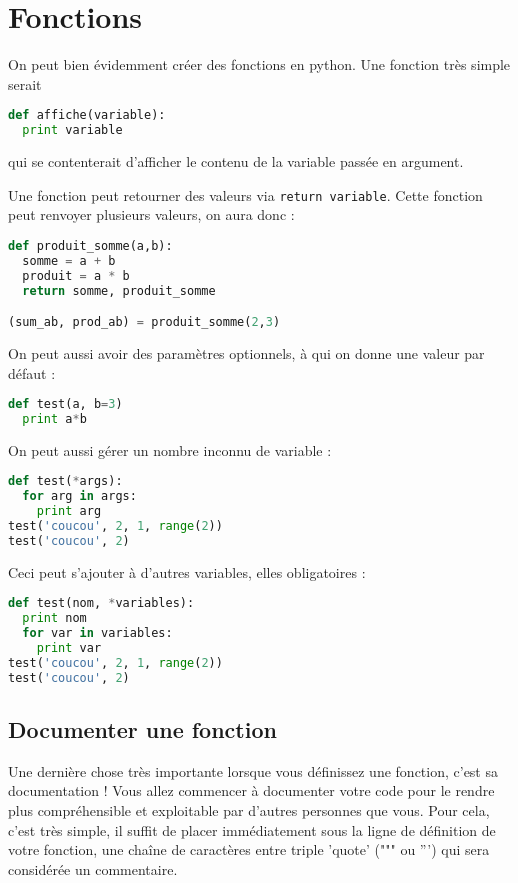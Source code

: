 \documentclass[a4paper,twoside]{article}
\begin{document}
\section{Fonctions}
On peut bien évidemment créer des fonctions en python. Une fonction très simple serait
\begin{lstlisting}[language=python]
def affiche(variable):
  print variable
\end{lstlisting}
qui se contenterait d'afficher le contenu de la variable passée en argument.

Une fonction peut retourner des valeurs via \verb|return variable|. Cette fonction peut renvoyer plusieurs valeurs, on aura donc :
\begin{lstlisting}[language=python]
def produit_somme(a,b):
  somme = a + b
  produit = a * b
  return somme, produit_somme

(sum_ab, prod_ab) = produit_somme(2,3)
\end{lstlisting}

On peut aussi avoir des paramètres optionnels, à qui on donne une valeur par défaut :
\begin{lstlisting}[language=python]
def test(a, b=3)
  print a*b
\end{lstlisting}

On peut aussi gérer un nombre inconnu de variable :
\begin{lstlisting}[language=python]
def test(*args):
  for arg in args:
    print arg
test('coucou', 2, 1, range(2))
test('coucou', 2)
\end{lstlisting}

Ceci peut s'ajouter à d'autres variables, elles obligatoires :
\begin{lstlisting}[language=python]
def test(nom, *variables):
  print nom
  for var in variables:
    print var
test('coucou', 2, 1, range(2))
test('coucou', 2)
\end{lstlisting}

\subsection{Documenter une fonction}

Une dernière chose très importante lorsque vous définissez une fonction, c'est sa documentation ! Vous allez commencer à documenter votre code pour le rendre plus compréhensible et exploitable par d'autres personnes que vous. Pour cela, c'est très simple, il suffit de placer immédiatement sous la ligne de définition de votre fonction, une chaîne de caractères entre triple 'quote' (""" ou ''') qui sera considérée un commentaire.
\end{document}
